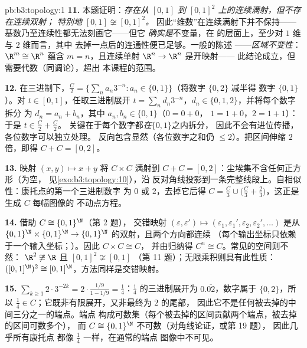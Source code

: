 \begin{solution}{pb:b3:topology:1}
\textbf{11.} 本题证明：\emph{存在从 $[0,1]$ 到
$[0,1]^2$ 上的连续满射，但不存在连续双射；
特别地 $[0,1] \not\cong [0,1]^2$。}
因此“维数”在连续满射下并不保持——
基数乃至连续性都无法刻画它——但它
\emph{确实是}不变量，在
的层面上，至少对 $1$ 维与 $2$ 维而言，其中
去掉一点后的连通性便已足够。一般的陈述
——\emph{区域不变性}：$\R^m \cong \R^n$ 蕴含 $m =
n$，且连续单射 $\R^n \to \R^n$ 是开映射——
此结论成立，但需要代数（同调论），超出
本课程的范围。

\textbf{12.} 在三进制下，$\frac C2 = \{\sum_na_n3^{-n} : a_n
\in \{0, 1\}\}$（将数字 $\{0,2\}$ 减半得
数字 $\{0,1\}$）。对 $t \in [0,1]$，任取三进制展开 $t =
\sum_nd_n3^{-n}$，$d_n \in \{0,1,2\}$，并将每个数字拆分
为 $d_n = a_n + b_n$，其中 $a_n, b_n \in \{0,1\}$（$0 = 0{+}0$，
$1 = 1{+}0$，$2 = 1{+}1$）：于是 $t \in \frac C2 + \frac C2$。
关键在于每个数字都\emph{在}$\{0,1\}$之内拆分，
因此不会有进位传播，各位数字可以独立处理。
反向包含显然（各位数字之和仍
$\leq 2$）。把区间伸缩 $2$ 倍，即得 $C + C = [0,2]$。

\textbf{13.} 映射 $(x, y) \mapsto x + y$ 将 $C \times C$
满射到 $C + C = [0,2]$：尘埃集不含任何正方形（为空，
见\cref{exo:b3:topology:10}），沿
反对角线投影到一条完整线段上。自相似性：康托点的第一个三进制数字
为 $0$ 或 $2$，去掉它后得
$C = \frac C3 \cup \bigl(\frac C3 +
\frac23\bigr)$，这正是生成 $C$ 每幅图像的
不动点方程。

\textbf{14.} 借助 $C \cong \{0,1\}^\N$（第 2 题），
交错映射 $(\varepsilon, \varepsilon') \mapsto
(\varepsilon_1, \varepsilon_1', \varepsilon_2,
\varepsilon_2', \dots)$ 是从
$\{0,1\}^\N\times\{0,1\}^\N \to \{0,1\}^\N$ 的双射，且两个方向都连续
（每个输出坐标只依赖于一个输入坐标；）。因此 $C\times C \cong C$，
并由归纳得 $C^n \cong C$。常见的空间则不然：
$\R^2 \not\cong \R$ 且 $[0,1]^2 \not\cong [0,1]$
（第 11 题）；无限乘积则具有此性质：$([0,1]^\N)^2 \cong
[0,1]^\N$，方法同样是交错映射。

\textbf{15.} $\sum_{k\geq1}2\cdot3^{-2k} = 2\cdot\frac{1/9}{1
- 1/9} = \frac14$：$\frac14$ 的三进制展开为
$0.\overline{02}$，数字属于 $\{0,2\}$，所以 $\frac14 \in
C$；它既非有限展开，又非最终为 $2$ 的尾部，
因此它不是任何被去掉的中间三分之一的端点。端点
构成可数集（每个被去掉的区间贡献两个端点，被去掉的区间可数多个），
而 $C \cong \{0,1\}^\N$ 不可数（对角线论证，或第 19 题），
因此几乎所有康托点
都像 $\frac14$ 一样，在通常的端点
图像中不可见。


\end{solution}
